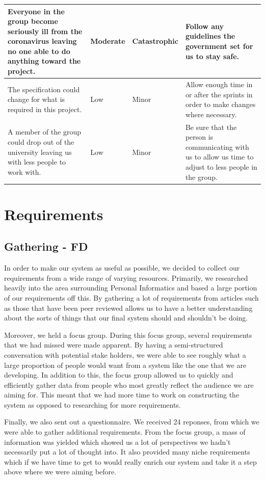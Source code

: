 \documentclass[11pt]{report}
\begin{document}
\begin{longtable}{| p{5.5cm} | p{2cm} | p{2cm} |  p{5.5cm} |}
Everyone in the group become seriously ill from the coronavirus leaving no one able to do anything toward the project.&
Moderate&
Catastrophic&
Follow any guidelines the government set for us to stay safe.\\
\hline

The specification could change for what is required in this project.& 
Low&
Minor&
Allow enough time in or after the sprints in order to make changes where necessary.\\
\hline

A member of the group could drop out of the university leaving us with less people to work with.& 
Low&
Minor&
Be sure that the person is communicating with us to allow us time to adjust to less people in the group.\\
\hline


\end{longtable}

\chapter{Requirements}

\section{Gathering - FD}

In order to make our system as useful as possible, we decided to collect our requirements from a wide range of varying resources. Primarily, we researched heavily into the area surrounding Personal Informatics and based a large portion of our requirements off this. By gathering a lot of requirements from articles such as those that have been peer reviewed allows us to have a better understanding about the sorts of things that our final system should and shouldn’t be doing.

Moreover, we held a focus group. During this focus group, several requirements that we had missed were made apparent. By having a semi-structured conversation with potential stake holders, we were able to see roughly what a large proportion of people would want from a system like the one that we are developing. In addition to this, the focus group allowed us to quickly and efficiently gather data from people who most greatly reflect the audience we are aiming for. This meant that we had more time to work on constructing the system as opposed to researching for more requirements.

Finally, we also sent out a questionnaire. We received 24 reponses, from which we were able to gather additional requirements. From the focus group, a mass of information was yielded which showed us a lot of perspectives we hadn’t necessarily put a lot of thought into. It also provided many niche requirements which if we have time to get to would really enrich our system and take it a step above where we were aiming before.
\end{document}
